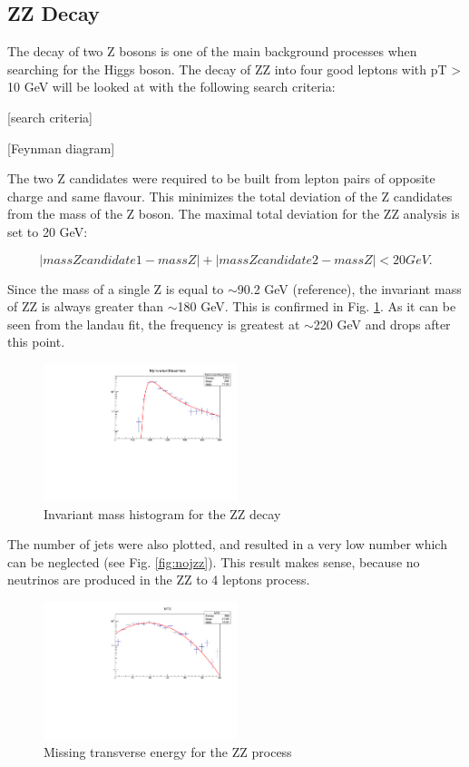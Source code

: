 \documentclass[runningheads,a4paper]{llncs}
\begin{document}
\subsection{ZZ Decay}

The decay of two Z bosons is one of the main background processes when searching for the Higgs boson. The decay of ZZ into four good leptons with pT > 10 GeV will be looked at with the following search criteria:

[search criteria] 

[Feynman diagram]

The two Z candidates were required to be built from lepton pairs of opposite charge and same flavour. This minimizes the total deviation of the Z candidates from the mass of the Z boson. The maximal total deviation for the ZZ analysis is set to 20 GeV:

\begin{equation}
|mass Z candidate 1 - mass Z| + |mass Z candidate 2 - mass Z| < 20 GeV.
\end{equation}

Since the mass of a single Z is equal to $\sim$90.2 GeV (reference), the invariant mass of ZZ is always greater than $\sim$180 GeV. This is confirmed in Fig. \ref{fig:invmzz}. As it can be seen from the landau fit, the frequency is greatest at $\sim$220 GeV and drops after this point.

\begin{figure}
\centering
\includegraphics[height=4cm]{MyInvariantMassHistoWtihFit_ZZ}
\caption{Invariant mass histogram for the ZZ decay}
\label{fig:invmzz}
\end{figure}

The number of jets were also plotted, and resulted in a very low number which can be neglected (see Fig. \ref{fig:nojzz}). This result makes sense, because no neutrinos are produced in the ZZ to 4 leptons process.

\begin{figure}
\centering
\includegraphics[height=4cm]{MTEWithFit_ZZ}
\caption{Missing transverse energy for the ZZ process}
\label{fig:mtezz}
\end{figure}
\end{document}
